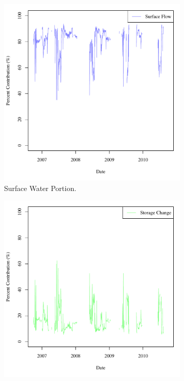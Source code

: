 \begin{linenumbers}
\begin{figure}[htbp]
\centering
	\begin{subfigure}{0.5\textwidth}
		\centering
		\includegraphics[width=0.9\linewidth]{"Figures/Results_DSR/M Water Contrib 1"}
		\caption{Surface Water Portion.}
		\label{sub:DSRWSurf}
	\end{subfigure}%
	\begin{subfigure}{0.5\textwidth}
		\centering
		\includegraphics[width=0.9\linewidth]{"Figures/Results_DSR/M Water Contrib 3"}

\end{subfigure}
\end{figure}
\end{linenumbers}
